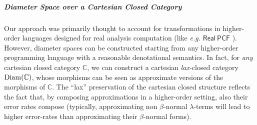 %
%
%
%
%
%
%
%
%
% 
%
%
%
%
%
%
%





%
\subparagraph*{Diameter Space over a Cartesian Closed Category}




Our approach was primarily thought to account for transformations in higher-order languages designed for real analysis computation (like \emph{e.g.} $\mathsf{Real\ PCF}$ \cite{Edalat:2000aa}). However, diameter spaces can be constructed starting from any higher-order programming language with a reasonable denotational semantics. In fact, for \emph{any} cartesian closed category $\mathbb C$, we can construct a cartesian \emph{lax-}closed category $\operatorname{Diam}(\mathbb C)$, whose morphisms can be seen as approximate versions  of the morphisms of $\mathbb C$. The ``lax'' preservation of the cartesian closed structure reflects the fact that, by composing approximations in a higher-order setting, also their error rates compose (typically, approximating non $\beta$-normal $\lambda$-terms will lead to higher error-rates than approximating their $\beta$-normal forms). 



